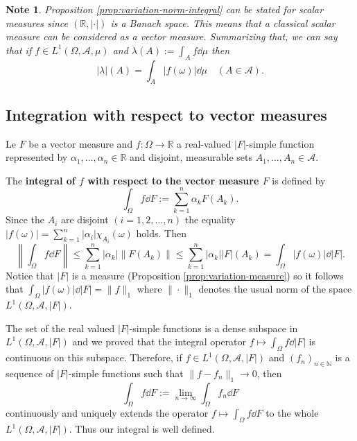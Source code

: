 \documentclass[a4paper, 12pt]{article}
\newtheorem{note}[lem]{Note}
\begin{document}
\begin{note}\normalfont
Proposition \ref{prop:variation-norm-integral} can be stated for scalar measures since $(\mathbb{R}, |\cdot|)$ is a Banach space. This means that a classical scalar measure can be considered as a vector measure. Summarizing that, we can say that if $f \in L^1(\Omega, \mathcal{A}, \mu)$ and $\lambda(A) := \int_{A} f \dd{\mu}$ then
$$|\lambda|(A) = \int_{A} |f(\omega)| \dd{\mu} \quad (A \in \mathcal{A}).$$
\end{note}

\subsection{Integration with respect to vector measures}\label{subsec:integration-with-respect-to-vector-measures}
Le $F$ be a vector measure and $f \colon \Omega \to \mathbb{R}$ a real-valued $|F|$-simple function represented by $\alpha_1,\ldots,\alpha_n \in \mathbb{R}$ and disjoint, measurable sets $A_1,\ldots,A_n \in \mathcal{A}$.

The \textbf{integral of $f$ with respect to the vector measure $F$} is defined by
$$\int_{\Omega} f \dd{F} := \sum^{n}_{k=1} \alpha_k F(A_k).$$
Since the $A_i$ are disjoint $(i = 1,2,\ldots,n)$ the equality $|f(\omega)| = \sum^{n}_{k=1} | \alpha_i | \chi_{A_i}(\omega)$ holds. Then
$$\left \| \int_{\Omega} f \dd{F} \right \| \leqslant \sum^{n}_{k=1} |\alpha_k| \| F(A_k) \| \leqslant \sum^{n}_{k=1} |\alpha_k| |F|(A_k) = \int_{\Omega} |f(\omega)| \dd{|F|}.$$
Notice that $|F|$ is a measure (Proposition \ref{prop:variation-measure}) so it follows that $\int_{\Omega} |f(\omega)| \dd{|F|} = \| f \|_1$ where $\| \cdot \|_1$ denotes the usual norm of the space $L^1(\Omega, \mathcal{A}, |F|)$.

The set of the real valued $|F|$-simple functions is a dense subspace in $L^1(\Omega, \mathcal{A}, |F|)$ and we proved that the integral operator $f \mapsto \int_{\Omega} f \dd{|F|}$ is continuous on this subspace. Therefore, if $f\in L^1(\Omega, \mathcal{A}, |F|)$ and $(f_n)_{n \in \mathbb{N}}$ is a sequence of $|F|$-simple functions such that $\| f - f_n \|_1 \to 0$, then
$$\int_{\Omega} f \dd{F} := \lim_{n \to \infty} \int_{\Omega} f_n \dd{F}$$
continuously and uniquely extends the operator $f \mapsto \int_{\Omega} f \dd{F}$ to the whole $L^1(\Omega, \mathcal{A}, |F|)$. Thus our integral is well defined.
\end{document}

